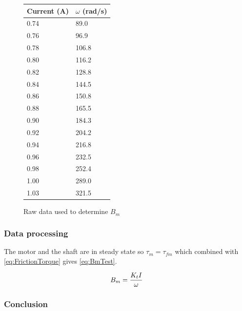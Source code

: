 \begin{figure}[htbp]
	\centering
	\caption{Raw data used to determine $B_m$}\label{tab_appendix:BmData}
	\begin{tabularx}{0.35\textwidth}{XX}
		Current (A) & $\omega$ (rad/s)\\ \toprule \rowcolor{lightGrey}
	0.74 & 89.0  \\
0.76 & 96.9  \\ \rowcolor{lightGrey}
0.78 & 106.8 \\
0.80 & 116.2 \\ \rowcolor{lightGrey}
0.82 & 128.8 \\
0.84 & 144.5 \\ \rowcolor{lightGrey}
0.86 & 150.8 \\
0.88 & 165.5 \\ \rowcolor{lightGrey}
0.90 & 184.3 \\
0.92 & 204.2 \\ \rowcolor{lightGrey}
0.94 & 216.8 \\
0.96 & 232.5 \\ \rowcolor{lightGrey}
0.98 & 252.4 \\
1.00 & 289.0 \\ \rowcolor{lightGrey}
1.03 & 321.5
	\end{tabularx}
\end{figure}


\subsubsection*{Data processing}

The motor and the shaft are in steady state so $\tau_m=\tau_{fm}$ which combined with \autoref{eq:FrictionTorque} gives \autoref{eq:BmTest}.

\begin{equation}\label{eq:BmTest}
B_m=\frac{K_t I}{\omega} \addunit{\newton\per\radian\second}
\end{equation}
\startexplain
{}
\stopexplain

\subsubsection*{Conclusion}


